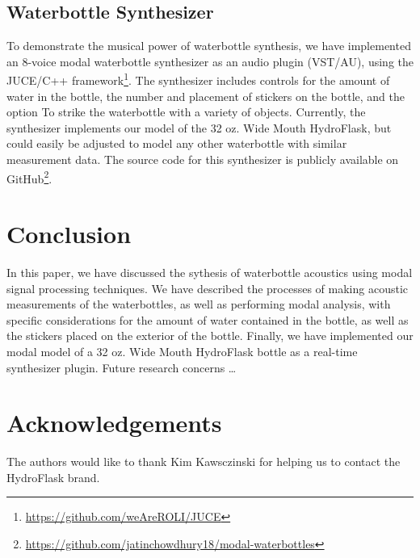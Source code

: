 \documentclass[twoside,a4paper]{article}
\begin{document}
\subsection{Waterbottle Synthesizer} \label{sec:synth}
%
To demonstrate the musical power of waterbottle synthesis, we have
implemented an 8-voice modal waterbottle synthesizer as an audio
plugin (VST/AU), using the JUCE/C++ framework\footnote{\url{https://github.com/weAreROLI/JUCE}}.
The synthesizer includes controls for the amount of water in the bottle,
the number and placement of stickers on the bottle, and the option To
strike the waterbottle with a variety of objects. Currently, the synthesizer
implements our model of the 32 oz. Wide Mouth HydroFlask, but could easily
be adjusted to model any other waterbottle with similar measurement data.
The source code for this synthesizer is publicly available on
GitHub\footnote{\url{https://github.com/jatinchowdhury18/modal-waterbottles}}.
%
\section{Conclusion} \label{sec:conclusion}
%
In this paper, we have discussed the sythesis of waterbottle acoustics
using modal signal processing techniques. We have described the processes
of making acoustic measurements of the waterbottles, as well as performing
modal analysis, with specific considerations for the amount of water
contained in the bottle, as well as the stickers placed on the exterior
of the bottle. Finally, we have implemented our modal model of a 32 oz.
Wide Mouth HydroFlask bottle as a real-time synthesizer plugin.
\newline\newline
Future research concerns \dots

\section{Acknowledgements}
%
The authors would like to thank Kim Kawsczinski for helping us to contact
the HydroFlask brand.

\nocite{*}


\end{document}
